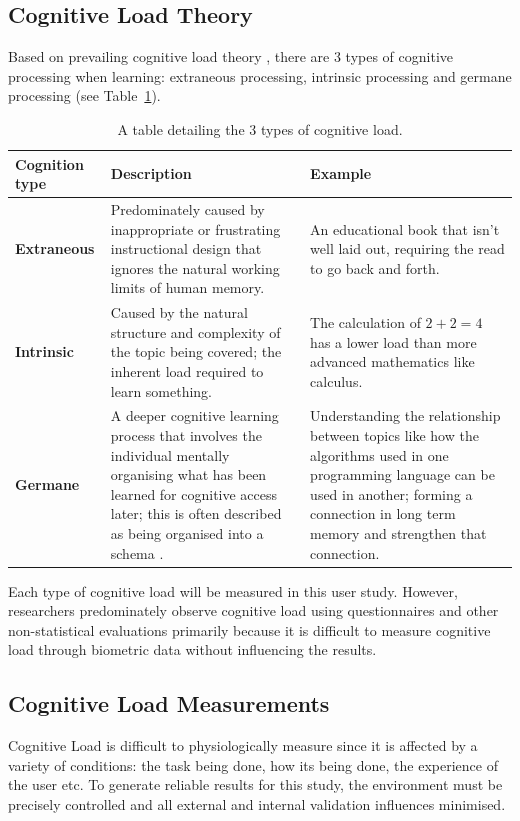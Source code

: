 \documentclass[conference]{IEEEtran}
\begin{document}
\subsection{Cognitive Load Theory}
Based on prevailing cognitive load theory \cite{deleeuw2008comparison,de2010cognitive,sweller1994cognitive}, there are 3 types of cognitive processing when learning: extraneous processing, intrinsic processing and germane processing (see Table~\ref{Tabel:1}).
\begin{table}[h!]
    \caption{A table detailing the 3 types of cognitive load.}
    \label{Tabel:1}
    \centering
    \begin{tabular}{| m{8em} | m{8cm}| m{6cm} |}
     \hline
     \textbf{Cognition type} & Description & Example \\ [0.5ex] 
      \hline\hline
       \textbf{Extraneous} & Predominately caused by inappropriate or frustrating instructional design that ignores the natural working limits of human memory. & An educational book that isn't well laid out, requiring the read to go back and forth. \\
         \hline
        \textbf{Intrinsic} & Caused by the natural structure and complexity of the topic being covered; the inherent load required to learn something. & The calculation of  $2+2=4$ has a lower load than more advanced mathematics like calculus.\\
         \hline
       \textbf{Germane} & A deeper cognitive learning process that involves the individual mentally organising what has been learned for cognitive access later; this is often described as being organised into a schema \cite{paas2003cognitive}.& Understanding the relationship between topics like how the algorithms used in one programming language can be used in another; forming a connection in long term memory and strengthen that connection.\\
         \hline
    \end{tabular}
\end{table}
\newline
 Each type of cognitive load will be measured in this user study. However, researchers predominately observe cognitive load using questionnaires and other non-statistical evaluations primarily because it is difficult to measure cognitive load through biometric data without influencing the results. 

\subsection{Cognitive Load Measurements}
Cognitive Load is difficult to physiologically measure since it is affected by a variety of conditions: the task being done, how its being done, the experience of the user etc. To generate reliable results for this study, the environment must be precisely controlled and all external and internal validation influences minimised.
\end{document}
